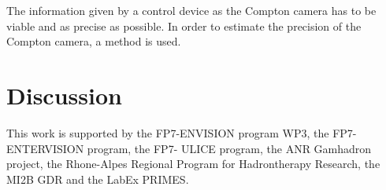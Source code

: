 \documentclass[12pt]{iopart}
\begin{document}
The information given by a control device as the Compton camera has to be viable and as precise as possible. In order to estimate the precision of the Compton camera, a method is used. 



\newpage
\section{Discussion}


\newpage
\ack

This work is supported by the FP7-ENVISION program WP3, the FP7-ENTERVISION program, the FP7- ULICE program, the ANR Gamhadron project, the Rhone-Alpes Regional Program for Hadrontherapy Research, the MI2B GDR and the LabEx PRIMES.\newline



\end{document}
